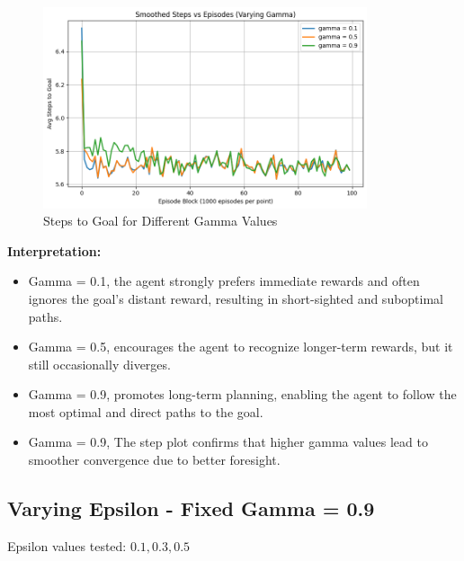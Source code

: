 \documentclass[12pt]{article}
\begin{document}
\begin{figure}[H]
  \centering
  \includegraphics[width=0.85\textwidth]{images/part1_q2_steps_vs_gamma.png}
  \caption{Steps to Goal for Different Gamma Values}
\end{figure}

\textbf{Interpretation:}
\begin{itemize}
  \item Gamma = 0.1, the agent strongly prefers immediate rewards and often ignores the goal's distant reward, resulting in \mbox{short-sighted} and suboptimal paths.
  \item Gamma = 0.5, encourages the agent to recognize longer-term rewards, but it still occasionally diverges.
  \item Gamma = 0.9, promotes long-term planning, enabling the agent to follow the most optimal and direct paths to the goal.
  \item Gamma = 0.9, The step plot confirms that higher gamma values lead to smoother convergence due to better foresight.
\end{itemize}

\subsection{Varying Epsilon - Fixed Gamma = 0.9}
Epsilon values tested: \(0.1, 0.3, 0.5\)
\end{document}
